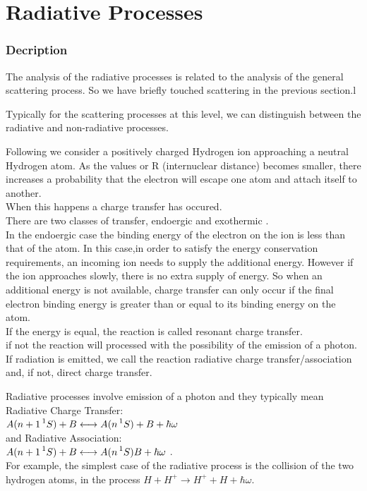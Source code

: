 \chapter{Radiative Processes}
\subsection{Decription}

The analysis of the radiative processes is related to the analysis of the general scattering process. So we have briefly touched scattering in the previous section.l

Typically for the scattering processes at this level, we can distinguish between the radiative and non-radiative processes. 

Following \cite{ZygelmanCT} we consider a positively charged Hydrogen ion approaching a neutral Hydrogen atom. As the values or R (internuclear distance) becomes smaller, there increases a probability that the electron will escape one atom and attach itself to another.\\
When this happens a charge transfer has occured. \\
There are two classes of transfer, endoergic and exothermic .\\
In the endoergic case the binding energy of the electron on the ion is less than that of the atom. In this case,in order to satisfy the energy conservation requirements, an incoming ion needs to supply the additional energy. However if the ion approaches slowly, there is no extra supply of energy. So when an additional energy is not available, charge transfer can only occur if the final electron binding energy is greater than or equal to its binding energy on the atom.\\
If the energy is equal, the reaction is called resonant charge transfer.\\
if not the reaction will processed with the possibility of the emission of a photon.
If radiation is emitted, we call the reaction radiative charge transfer/association and, if not, direct charge transfer.

Radiative processes involve emission of a photon and they typically mean Radiative Charge Transfer: \\
$ A(n+1\prescript{1}{}S) + B \longleftrightarrow A(n\prescript{1}{}S) + B + \hbar\omega $ \\
and Radiative Association: \\
$ A(n+1\prescript{1}{}S) + B \longleftrightarrow A(n\prescript{1}{}S)B + \hbar\omega $ .\\
For example, the simplest case of the radiative process is the collision of the two hydrogen atoms, in the process $ H + H^+ \rightarrow H^+ + H + \hbar\omega $.\\

